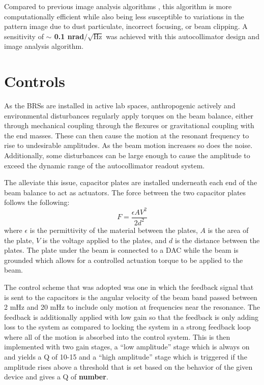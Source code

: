 \documentclass [12pt, proquest]{uwthesis}[2019]
\begin{document}
Compared to previous image analysis algorithms \cite{MSAPaper}, this algorithm is more computationally efficient while also being less susceptible to variations in the pattern image due to dust particulate, incorrect focusing, or beam clipping. A sensitivity of \textbf{$\sim$ 0.1 nrad$/\sqrt{\text{Hz}}$} was achieved with this autocollimator design and image analysis algorithm.

\section{Controls}

\quad As the BRSs are installed in active lab spaces, anthropogenic actively and environmental disturbances regularly apply torques on the beam balance, either through mechanical coupling through the flexures or gravitational coupling with the end masses. These can then cause the motion at the resonant frequency to rise to undesirable amplitudes. As the beam motion increases so does the noise. Additionally, some disturbances can be large enough to cause the amplitude to exceed the dynamic range of the autocollimator readout system.

The alleviate this issue, capacitor plates are installed underneath each end of the beam balance to act as actuators. The force between the two capacitor plates follows the following: 
\begin{equation}
F=\frac{\epsilon A V^2}{2d^2} \label{cap}
\end{equation}
where $\epsilon$ is the permittivity of the material between the plates, $A$ is the area of the plate, $V$ is the voltage applied to the plates, and $d$ is the distance between the plates. The plate under the beam is connected to a DAC while the beam is grounded which allows for a controlled actuation torque to be applied to the beam. 

The control scheme that was adopted was one in which the feedback signal that is sent to the capacitors is the angular velocity of the beam band passed between 2 mHz and 20 mHz to include only motion at frequencies near the resonance. The feedback is additionally applied with low gain so that the feedback is only adding loss to the system as compared to locking the system in a strong feedback loop where all of the motion is absorbed into the control system. This is then implemented with two gain stages, a ``low amplitude'' stage which is always on and yields a Q of 10-15 and a ``high amplitude'' stage which is triggered if the amplitude rises above a threshold that is set based on the behavior of the given device and gives a Q of \textbf{number}.
\end{document}
